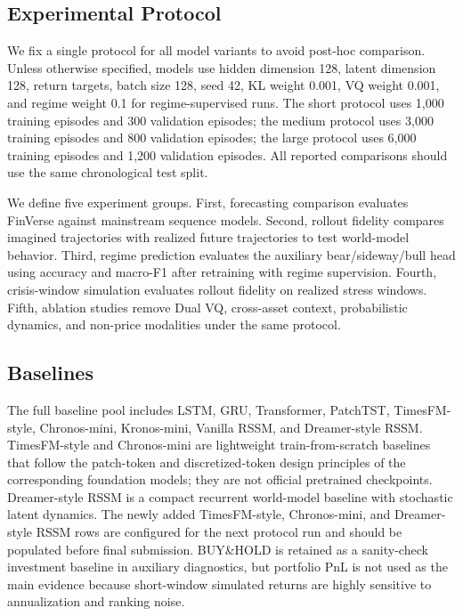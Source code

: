 \documentclass[letterpaper]{article}
\begin{document}
\subsection{Experimental Protocol}
We fix a single protocol for all model variants to avoid post-hoc comparison. Unless otherwise specified, models use hidden dimension 128, latent dimension 128, return targets, batch size 128, seed 42, KL weight 0.001, VQ weight 0.001, and regime weight 0.1 for regime-supervised runs. The short protocol uses 1,000 training episodes and 300 validation episodes; the medium protocol uses 3,000 training episodes and 800 validation episodes; the large protocol uses 6,000 training episodes and 1,200 validation episodes. All reported comparisons should use the same chronological test split.

We define five experiment groups. First, forecasting comparison evaluates FinVerse against mainstream sequence models. Second, rollout fidelity compares imagined trajectories with realized future trajectories to test world-model behavior. Third, regime prediction evaluates the auxiliary bear/sideway/bull head using accuracy and macro-F1 after retraining with regime supervision. Fourth, crisis-window simulation evaluates rollout fidelity on realized stress windows. Fifth, ablation studies remove Dual VQ, cross-asset context, probabilistic dynamics, and non-price modalities under the same protocol.

\subsection{Baselines}
The full baseline pool includes LSTM, GRU, Transformer, PatchTST, TimesFM-style, Chronos-mini, Kronos-mini, Vanilla RSSM, and Dreamer-style RSSM. TimesFM-style and Chronos-mini are lightweight train-from-scratch baselines that follow the patch-token and discretized-token design principles of the corresponding foundation models; they are not official pretrained checkpoints. Dreamer-style RSSM is a compact recurrent world-model baseline with stochastic latent dynamics. The newly added TimesFM-style, Chronos-mini, and Dreamer-style RSSM rows are configured for the next protocol run and should be populated before final submission. BUY\&HOLD is retained as a sanity-check investment baseline in auxiliary diagnostics, but portfolio PnL is not used as the main evidence because short-window simulated returns are highly sensitive to annualization and ranking noise.
\end{document}
